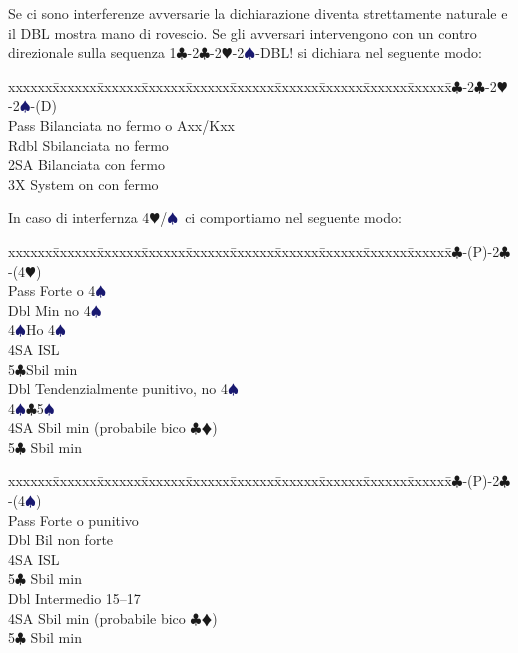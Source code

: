 \documentclass[a4paper,italian]{article}
\newcommand{\BC}{\textcolor{OliveGreen}{$\clubsuit$}}
\newcommand{\BD}{\textcolor{RedOrange}{$\vardiamondsuit$}}
\newcommand{\BH}{\textcolor{Red2}{$\varheartsuit${}}}
\newcommand{\BS}{\textcolor{MidnightBlue}{$\spadesuit${}}}
\newenvironment{bidtable}
{\begin{tabbing}

    xxxxxx\=xxxxxx\=xxxxxx\=xxxxxx\=xxxxxx\=xxxxxx\=xxxxxx\=xxxxxx\=xxxxxx\=xxxxxx\=\kill}
{\end{tabbing} }%
\newenvironment{attenzione}[1]
{\begin{tcolorbox}[colframe=red!80!white,title=#1]}
    {
\end{tcolorbox} }%
\begin{document}
\bigbreak
\begin{attenzione}{Interferenze}
    Se ci sono interferenze avversarie la dichiarazione diventa strettamente naturale e il DBL mostra mano di rovescio. Se gli avversari intervengono con un contro direzionale sulla sequenza 1\BC -2\BC -2\BH -2\BS -DBL! si dichiara nel seguente modo:
    \bigbreak
    \begin{bidtable}
        1\BC-2\BC-2\BH-2\BS-(D)\+\\
        Pass \> Bilanciata no fermo o Axx/Kxx\\
        Rdbl \> Sbilanciata no fermo\\
        2SA \> Bilanciata con fermo\\
        3X \> System on con fermo\-
    \end{bidtable}
    In caso di interfernza 4\BH /\BS\ ci comportiamo nel seguente modo:
    \bigbreak
    \begin{bidtable}
        1\BC-(P)-2\BC-(4\BH)\+\\
        Pass \> Forte o 4\BS\+\\
        Dbl \>Min no 4\BS\ \\
        4\BS \>Ho 4\BS\ \\
        4SA \> ISL\\
        5\BC \>Sbil min\-\\
        Dbl \> Tendenzialmente punitivo, no 4\BS \\
        4\BS {}\BC 5\BS \\
        4SA \> Sbil min (probabile bico \BC \BD )\\
        5\BC \> Sbil min\-
    \end{bidtable}
    \bigbreak
    \begin{bidtable}
        1\BC-(P)-2\BC-(4\BS)\+\\
        Pass \> Forte o punitivo\+\\
        Dbl\> Bil non forte\\
        4SA\> ISL\\
        5\BC\> Sbil min\-\\
        Dbl \> Intermedio 15--17\\
        4SA \> Sbil min (probabile bico \BC \BD )\\
        5\BC \> Sbil min\-
    \end{bidtable}
\end{attenzione}
\end{document}
